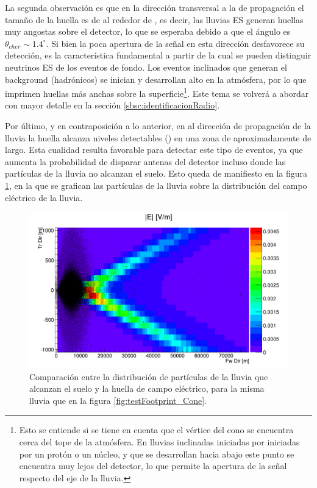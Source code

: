 	La segunda observación es que en la dirección transversal a la de propagación el tamaño de la huella es de al rededor de , es decir, las lluvias ES generan huellas muy angostas sobre el detector, lo que se esperaba debido a que el \'angulo \cher{} es $\theta_{cher}\sim1.4^\circ$.
	Si bien la poca apertura de la se\~nal en esta direcci\'on desfavorece su detecci\'on, es la característica fundamental a partir de la cual se pueden distinguir neutrinos ES de los eventos de fondo.
	Los eventos inclinados que generan el background (hadr\'onicos) se inician y desarrollan alto en la atmósfera, por lo que imprimen huellas m\'as anchas sobre la superficie\footnote{Esto se entiende si se tiene en cuenta que el v\'ertice del cono \cher{} se encuentra cerca del tope de la atm\'osfera. En lluvias inclinadas iniciadas por iniciadas por un prot\'on o un n\'ucleo, y que se desarrollan hacia abajo este punto se encuentra muy lejos del detector, lo que permite la apertura de la se\~nal respecto del eje de la lluvia.}.
	Este tema se volverá a abordar con mayor detalle en la sección \ref{sbsc:identificacionRadio}.
	 
	Por último, y en contraposición a lo anterior, en al dirección de propagación de la lluvia la huella alcanza niveles detectables () en una zona de aproximadamente  de largo.
	Esta cualidad resulta favorable para detectar este tipo de eventos, ya que aumenta la probabilidad de disparar antenas del detector incluso donde las part\'iculas de la lluvia no alcanzan el suelo.
	Esto queda de manifiesto en la figura \ref{fig:sim_foot_y_part}, en la que se grafican las part\'iculas de la lluvia sobre la distribuci\'on del campo el\'ectrico de la lluvia.
	\begin{figure}[ht!]
		\centering
		\includegraphics[width=\textwidth]{./fig/simulacionRadio/foorPrint_Test_18_89-5_90_25_1238_E_particles}
		\caption{\label{fig:sim_foot_y_part}
		Comparaci\'on entre la distribuci\'on de part\'iculas de la lluvia que alcanzan el suelo y la huella de campo el\'ectrico, para la misma lluvia que en la figura \ref{fig:testFootprint_Cone}.
		}
	\end{figure}
	

